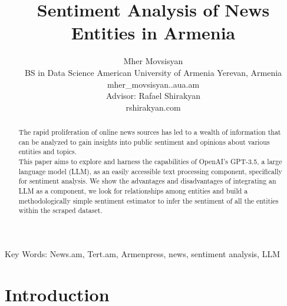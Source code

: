 \documentclass{IEEEtran}
\author{Mher Movsisyan \\ BS in Data Science American University of Armenia Yerevan, Armenia\\ mher\_movsisyan.\@edu.aua.am\\[1cm]{\small Advisor: Rafael Shirakyan\\ rshirakyan\@gmail.com}}
\title{Sentiment Analysis of News Entities in Armenia}
\begin{document}
\maketitle

\begin{abstract}
The rapid proliferation of online news sources has led to a wealth of information that can be analyzed to gain insights into public sentiment and opinions about various entities and topics. \\
This paper aims to explore and harness the capabilities of OpenAI’s GPT-3.5, a large language model (LLM), as an easily accessible text processing component, specifically for sentiment analysis. We show the advantages and disadvantages of integrating an LLM as a component, we look for relationships among entities and build a methodologically simple sentiment estimator to infer the sentiment of all the entities within the scraped dataset.
\end{abstract}
{Key Words:}
News.am, Tert.am, Armenpress, news, sentiment analysis, LLM

\section{Introduction}
\end{document}
